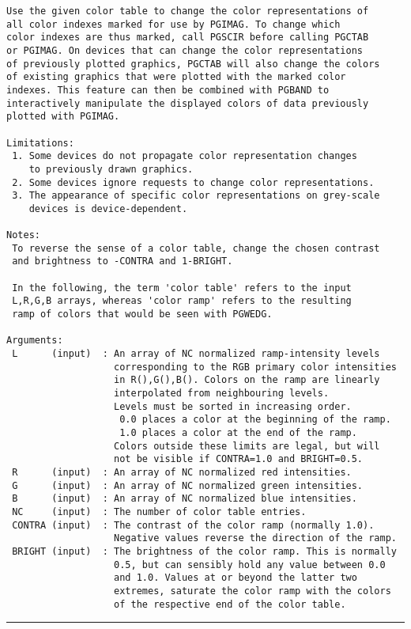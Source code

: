 {\begin{verbatim}
Use the given color table to change the color representations of
all color indexes marked for use by PGIMAG. To change which
color indexes are thus marked, call PGSCIR before calling PGCTAB
or PGIMAG. On devices that can change the color representations
of previously plotted graphics, PGCTAB will also change the colors
of existing graphics that were plotted with the marked color
indexes. This feature can then be combined with PGBAND to
interactively manipulate the displayed colors of data previously
plotted with PGIMAG.

Limitations:
 1. Some devices do not propagate color representation changes
    to previously drawn graphics.
 2. Some devices ignore requests to change color representations.
 3. The appearance of specific color representations on grey-scale
    devices is device-dependent.

Notes:
 To reverse the sense of a color table, change the chosen contrast
 and brightness to -CONTRA and 1-BRIGHT.

 In the following, the term 'color table' refers to the input
 L,R,G,B arrays, whereas 'color ramp' refers to the resulting
 ramp of colors that would be seen with PGWEDG.

Arguments:
 L      (input)  : An array of NC normalized ramp-intensity levels
                   corresponding to the RGB primary color intensities
                   in R(),G(),B(). Colors on the ramp are linearly
                   interpolated from neighbouring levels.
                   Levels must be sorted in increasing order.
                    0.0 places a color at the beginning of the ramp.
                    1.0 places a color at the end of the ramp.
                   Colors outside these limits are legal, but will
                   not be visible if CONTRA=1.0 and BRIGHT=0.5.
 R      (input)  : An array of NC normalized red intensities.
 G      (input)  : An array of NC normalized green intensities.
 B      (input)  : An array of NC normalized blue intensities.
 NC     (input)  : The number of color table entries.
 CONTRA (input)  : The contrast of the color ramp (normally 1.0).
                   Negative values reverse the direction of the ramp.
 BRIGHT (input)  : The brightness of the color ramp. This is normally
                   0.5, but can sensibly hold any value between 0.0
                   and 1.0. Values at or beyond the latter two
                   extremes, saturate the color ramp with the colors
                   of the respective end of the color table.
\end{verbatim}
\hrule


}

